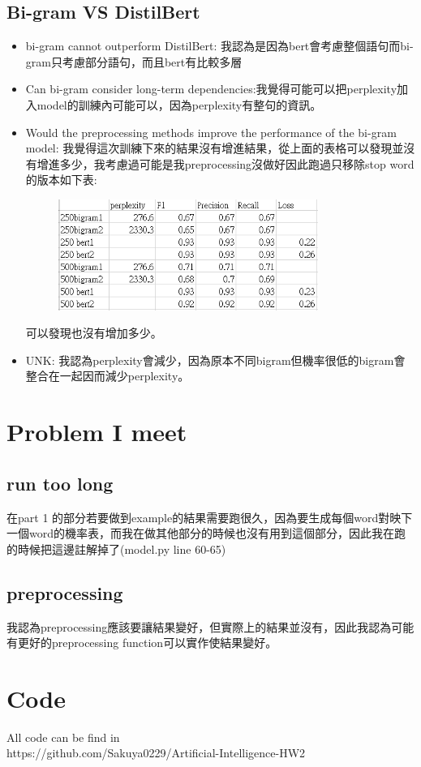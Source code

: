 \documentclass[12,a4paper]{article}
\begin{document}
\subsection{Bi-gram VS DistilBert}
\begin{itemize}
    \item bi-gram cannot outperform DistilBert: 我認為是因為bert會考慮整個語句而bi-gram只考慮部分語句，而且bert有比較多層
    \item Can bi-gram consider long-term dependencies:我覺得可能可以把perplexity加入model的訓練內可能可以，因為perplexity有整句的資訊。
    \item Would the preprocessing methods improve the performance of the bi-gram model: 我覺得這次訓練下來的結果沒有增進結果，從上面的表格可以發現並沒有增進多少，我考慮過可能是我preprocessing沒做好因此跑過只移除stop word的版本如下表:
    \begin{figure}[!ht]
    \centering
    \includegraphics[width=0.8\textwidth]{pic/sheet2.png}
    \end{figure}
    \FloatBarrier
    可以發現也沒有增加多少。
    \item UNK: 我認為perplexity會減少，因為原本不同bigram但機率很低的bigram會整合在一起因而減少perplexity。
\end{itemize}
\section{Problem I meet}
\subsection{run too long}
在part 1 的部分若要做到example的結果需要跑很久，因為要生成每個word對映下一個word的機率表，而我在做其他部分的時候也沒有用到這個部分，因此我在跑的時候把這邊註解掉了(model.py line 60-65)
\subsection{preprocessing}
我認為preprocessing應該要讓結果變好，但實際上的結果並沒有，因此我認為可能有更好的preprocessing function可以實作使結果變好。
\section{Code}
All code can be find in\\
https://github.com/Sakuya0229/Artificial-Intelligence-HW2
\end{document}
